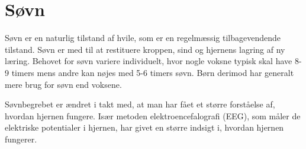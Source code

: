 \section{Søvn}\label{sec:Soevn_generelt}
Søvn er en naturlig tilstand af hvile, som er en regelmæssig tilbagevendende tilstand. Søvn er med til at restituere kroppen, sind og hjernens lagring af ny læring. Behovet for søvn variere individuelt, hvor nogle voksne typisk skal have 8-9 timers mens andre kan nøjes med 5-6 timers søvn. Børn derimod har generalt mere brug for søvn end voksene. 

Søvnbegrebet er ændret i takt med, at man har fået et større forståelse af, hvordan hjernen fungere. Især metoden elektroencefalografi (EEG), som måler de elektriske potentialer i hjernen, har givet en større indsigt i, hvordan hjernen fungerer.  
